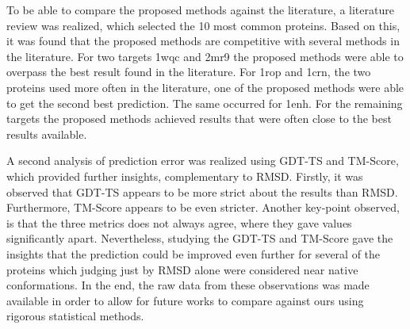 

To be able to compare the proposed methods against the literature, a literature
review was realized, which selected the 10 most common proteins.
Based on this, it was found that the proposed methods are
competitive with several methods in the literature. For two targets 1wqc and
2mr9 the proposed methods were able to overpass the best result found in the
literature. For 1rop and 1crn, the two proteins used more often in the
literature, one of the proposed methods were able to get the second best
prediction. The same occurred for 1enh. For the remaining targets the proposed
methods achieved results that were often close to the best results available.

A second analysis of prediction error was realized using GDT-TS and TM-Score,
which provided further insights, complementary to RMSD. Firstly, it was observed
that GDT-TS appears to be more strict about the results than RMSD. Furthermore,
TM-Score appears to be even stricter. Another key-point observed, is that the
three metrics does not always agree, where they gave values significantly
apart. Nevertheless, studying the GDT-TS and TM-Score gave the insights that
the prediction could be improved even further for several of the proteins which
judging just by RMSD alone were considered near native conformations. In the end,
the raw data from these observations was made available in order to allow for
future works to compare against ours using rigorous statistical methods.

